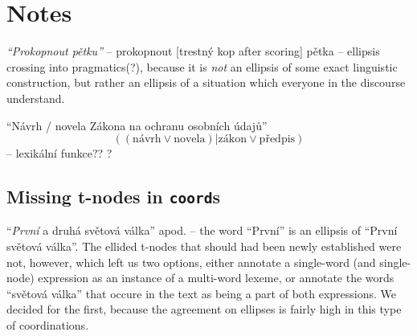 \documentclass[11pt, a4paper]{article}
\def\code{\texttt}
\begin{document}
\newpage
\section{Notes}

{\em``Prokopnout pětku''} -- prokopnout [trestný kop after scoring] pětka -- ellipsis crossing into pragmatics(?), because it is {\em not} an ellipsis of some exact linguistic construction, but rather an ellipsis of a situation which everyone in the discourse understand.  

``Návrh / novela Zákona na ochranu osobních údajů''  $$((\mathrm{návrh} \lor \mathrm{novela}) | \mathrm{zákon} \lor \mathrm{předpis})$$
-- lexikální funkce?? \citep{wanner} ?

\subsection{Missing t-nodes in \code{coord}s}
``\textit{První} a druhá světová válka'' apod. -- the word ``První'' is an ellipsis of ``První světová válka''. The ellided t-nodes that should had been newly established were not, however, which left us two options, either annotate a single-word (and single-node) expression as an instance of a multi-word lexeme, or annotate the words ``světová válka'' that occure in the text as being a part of both expressions. We decided for the first, because the agreement on ellipses is fairly high in this type of coordinations.




\end{document}
